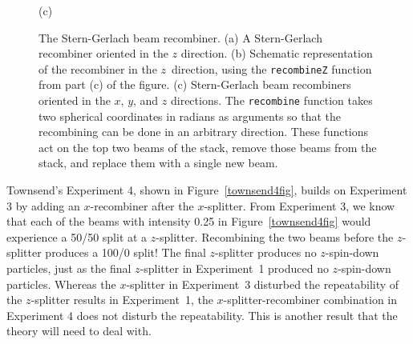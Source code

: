 \documentclass[12pt]{article}
\newcommand{\FunctionTok}[1]{\textcolor[rgb]{0.02,0.16,0.49}{{#1}}}
\begin{document}
\begin{figure}
\begin{center}
(c)
  \end{center}
\caption{The Stern-Gerlach beam recombiner.
  (a) A Stern-Gerlach recombiner oriented in the $z$ direction.
  (b) Schematic representation of the recombiner in the $z$~direction,
   using the \FunctionTok{\texttt{recombineZ}} function from part (c)
   of the figure.
  (c) Stern-Gerlach beam recombiners oriented in the $x$, $y$, and $z$ directions.
  The \FunctionTok{\texttt{recombine}} function takes two spherical coordinates in radians as
  arguments so that the recombining can be done in an arbitrary direction.
  These functions act on the top two beams of the stack, remove those
  beams from the stack, and replace them with a single new beam.
}
\label{sgrecombiner}
\end{figure}

Townsend's Experiment 4, shown in Figure~\ref{townsend4fig},
builds on Experiment 3 by adding an $x$-recombiner after the $x$-splitter.
From Experiment 3, we know that each of the beams with intensity 0.25
in Figure~\ref{townsend4fig} would experience a 50/50 split at a $z$-splitter.
Recombining the two beams before the $z$-splitter produces a 100/0 split!
The final $z$-splitter produces no $z$-spin-down particles, just as the
final $z$-splitter in Experiment~1 produced no $z$-spin-down particles.
Whereas the $x$-splitter in Experiment~3 disturbed the repeatability
of the $z$-splitter results in Experiment~1, the $x$-splitter-recombiner
combination in Experiment 4 does not disturb the repeatability.
This is another result that the theory will need to deal with.
\end{document}
